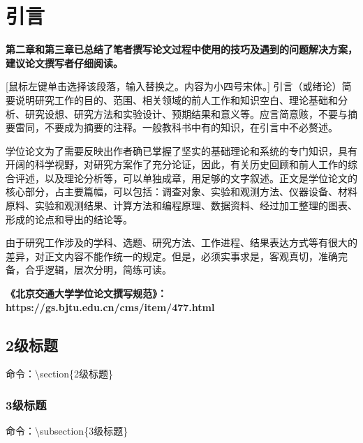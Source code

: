 \setlength{\baselineskip}{20pt}
\chapter{引言}
\label{cha:intro}

\textbf{第二章和第三章已总结了笔者撰写论文过程中使用的技巧及遇到的问题解决方案，建议论文撰写者仔细阅读。}

[鼠标左键单击选择该段落，输入替换之。内容为小四号宋体。] 引言（或绪论）简要说明研究工作的目的、范围、相关领域的前人工作和知识空白、理论基础和分析、研究设想、研究方法和实验设计、预期结果和意义等。应言简意赅，不要与摘要雷同，不要成为摘要的注释。一般教科书中有的知识，在引言中不必赘述。


学位论文为了需要反映出作者确已掌握了坚实的基础理论和系统的专门知识，具有开阔的科学视野，对研究方案作了充分论证，因此，有关历史回顾和前人工作的综合评述，以及理论分析等，可以单独成章，用足够的文字叙述。正文是学位论文的核心部分，占主要篇幅，可以包括：调查对象、实验和观测方法、仪器设备、材料原料、实验和观测结果、计算方法和编程原理、数据资料、经过加工整理的图表、形成的论点和导出的结论等。


由于研究工作涉及的学科、选题、研究方法、工作进程、结果表达方式等有很大的差异，对正文内容不能作统一的规定。但是，必须实事求是，客观真切，准确完备，合乎逻辑，层次分明，简练可读。


\textbf{《北京交通大学学位论文撰写规范》：https://gs.bjtu.edu.cn/cms/item/477.html}


\section{2级标题}

命令：\textbackslash section\{2级标题\}


\subsection{3级标题}

命令：\textbackslash subsection\{3级标题\}